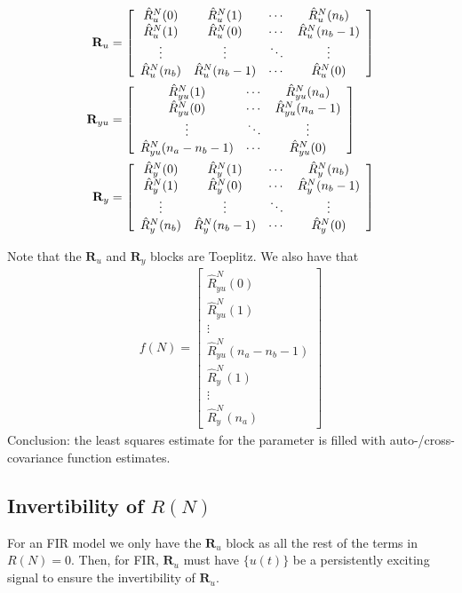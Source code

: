 \begin{align*}
\mathbf{R}_u &= \left[\begin{array}{c c c c}
\hat{R}_u^N(0) & \hat{R}_u^N(1) & \cdots & \hat{R}_u^N(n_b) \\
\hat{R}_u^N(1) & \hat{R}_u^N(0) & \cdots & \hat{R}_u^N(n_b-1) \\
\vdots & \vdots & \ddots & \vdots \\
\hat{R}_u^N(n_b) & \hat{R}_u^N(n_b-1) & \cdots & \hat{R}_u^N(0)
\end{array}\right] \\
\mathbf{R}_{yu} &= \left[\begin{array}{c c c}
\hat{R}_{yu}^N(1) & \cdots & \hat{R}_{yu}^N(n_a) \\
\hat{R}_{yu}^N(0) & \cdots & \hat{R}_{yu}^N(n_a-1) \\
\vdots & \ddots & \vdots \\
\hat{R}_{yu}^N(n_a-n_b-1) & \cdots & \hat{R}_{yu}^N(0)
\end{array}\right] \\
\mathbf{R}_y &= \left[\begin{array}{c c c c}
\hat{R}_y^N(0) & \hat{R}_y^N(1) & \cdots & \hat{R}_y^N(n_b) \\
\hat{R}_y^N(1) & \hat{R}_y^N(0) & \cdots & \hat{R}_y^N(n_b-1) \\
\vdots & \vdots & \ddots & \vdots \\
\hat{R}_y^N(n_b) & \hat{R}_y^N(n_b-1) & \cdots & \hat{R}_y^N(0)
\end{array}\right]
\end{align*}

Note that the $\mathbf{R}_u$ and $\mathbf{R}_y$ blocks are Toeplitz. We also have that
\begin{align*}
f(N) = \left[\begin{array}{c}
\hat{R}_{yu}^N(0) \\
\hat{R}_{yu}^N(1) \\
\vdots \\
\hat{R}_{yu}^N(n_a-n_b-1) \\
\hline
\hat{R}_y^N(1) \\
\vdots \\
\hat{R}_y^N(n_a) \end{array}\right]
\end{align*}
Conclusion: the least squares estimate for the parameter is filled with auto-/cross-covariance function estimates.

\subsection{Invertibility of $R(N)$}
\label{sec:upersistent}
For an FIR model we only have the $\mathbf{R}_u$ block as all the rest of the terms in $R(N)=0$. Then, for FIR, $\mathbf{R}_u$ must have $\{u(t)\}$ be a persistently exciting signal to ensure the invertibility of $\mathbf{R}_u$.

